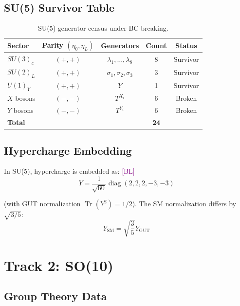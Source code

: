 \documentclass[11pt,a4paper]{article}
\newcommand{\tagBL}{\textcolor{purple}{[BL]}}
\DeclareMathOperator{\Tr}{Tr}
\DeclareMathOperator{\diag}{diag}
\begin{document}
\subsection{SU(5) Survivor Table}

\begin{table}[h]
\centering
\begin{tabular}{lcccc}
\toprule
Sector & Parity $(\eta_0,\eta_L)$ & Generators & Count & Status \\
\midrule
$SU(3)_c$ & $(+,+)$ & $\lambda_1, \ldots, \lambda_8$ & 8 & Survivor \\
$SU(2)_L$ & $(+,+)$ & $\sigma_1, \sigma_2, \sigma_3$ & 3 & Survivor \\
$U(1)_Y$ & $(+,+)$ & $Y$ & 1 & Survivor \\
$X$ bosons & $(-,-)$ & $T^{X_i}$ & 6 & Broken \\
$Y$ bosons & $(-,-)$ & $T^{Y_i}$ & 6 & Broken \\
\midrule
\textbf{Total} & & & \textbf{24} & \\
\bottomrule
\end{tabular}
\caption{SU(5) generator census under BC breaking.}
\label{tab:su5}
\end{table}

\subsection{Hypercharge Embedding}

In SU(5), hypercharge is embedded as: \tagBL
\begin{equation}
\label{eq:su5-Y}
Y = \frac{1}{\sqrt{60}} \diag(2, 2, 2, -3, -3)
\end{equation}

(with GUT normalization $\Tr(Y^2) = 1/2$). The SM normalization differs by
$\sqrt{3/5}$:
\begin{equation}
\label{eq:Y-normalization}
Y_{\text{SM}} = \sqrt{\frac{3}{5}} Y_{\text{GUT}}
\end{equation}

\section{Track 2: SO(10)}

\subsection{Group Theory Data}
\end{document}
